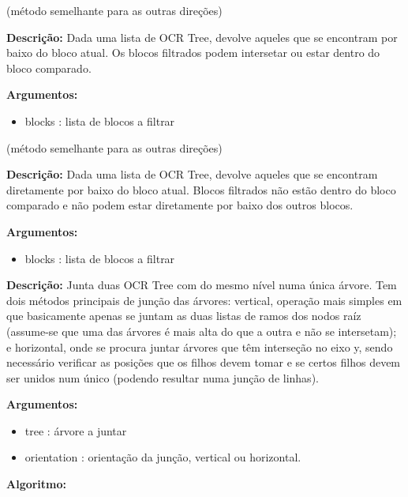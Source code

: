 (método semelhante para as outras direções)

\textbf{Descrição:} Dada uma lista de OCR Tree, devolve aqueles que se encontram por baixo do bloco atual. Os blocos filtrados podem intersetar ou estar dentro do bloco comparado.


\textbf{Argumentos:}
\begin{itemize}\setlength\itemsep{-0.3em}
	\item blocks : lista de blocos a filtrar
\end{itemize}



(método semelhante para as outras direções)

\textbf{Descrição:} Dada uma lista de OCR Tree, devolve aqueles que se encontram diretamente por baixo do bloco atual. Blocos filtrados não estão dentro do bloco comparado e não podem estar diretamente por baixo dos outros blocos.


\textbf{Argumentos:}
\begin{itemize}\setlength\itemsep{-0.3em}
	\item blocks : lista de blocos a filtrar
\end{itemize}
	
	
	

\textbf{Descrição:} Junta duas OCR Tree com do mesmo nível numa única árvore. Tem dois métodos principais de junção das árvores: vertical, operação mais simples em que basicamente apenas se juntam as duas listas de ramos dos nodos raíz (assume-se que uma das árvores é mais alta do que a outra e não se intersetam); e horizontal, onde se procura juntar árvores que têm interseção no eixo y, sendo necessário verificar as posições que os filhos devem tomar e se certos filhos devem ser unidos num único (podendo resultar numa junção de linhas).



\textbf{Argumentos:}
\begin{itemize}\setlength\itemsep{-0.3em}
	\item tree : árvore a juntar
	\item orientation : orientação da junção, vertical ou horizontal.
\end{itemize}

\textbf{Algoritmo:}

